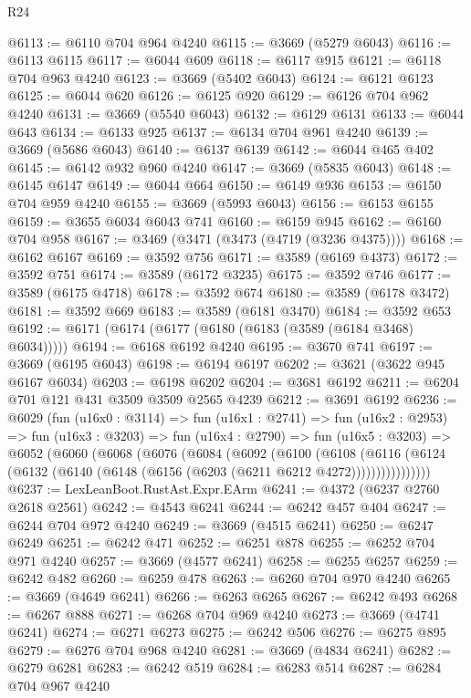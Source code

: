\begin{lexlean}{R24}
\begin{coremodule}
@6113 := @6110 @704 @964 @4240
@6115 := @3669 (@5279 @6043)
@6116 := @6113 @6115
@6117 := @6044 @609
@6118 := @6117 @915
@6121 := @6118 @704 @963 @4240
@6123 := @3669 (@5402 @6043)
@6124 := @6121 @6123
@6125 := @6044 @620
@6126 := @6125 @920
@6129 := @6126 @704 @962 @4240
@6131 := @3669 (@5540 @6043)
@6132 := @6129 @6131
@6133 := @6044 @643
@6134 := @6133 @925
@6137 := @6134 @704 @961 @4240
@6139 := @3669 (@5686 @6043)
@6140 := @6137 @6139
@6142 := @6044 @465 @402
@6145 := @6142 @932 @960 @4240
@6147 := @3669 (@5835 @6043)
@6148 := @6145 @6147
@6149 := @6044 @664
@6150 := @6149 @936
@6153 := @6150 @704 @959 @4240
@6155 := @3669 (@5993 @6043)
@6156 := @6153 @6155
@6159 := @3655 @6034 @6043 @741
@6160 := @6159 @945
@6162 := @6160 @704 @958
@6167 := @3469 (@3471 (@3473 (@4719 (@3236 @4375))))
@6168 := @6162 @6167
@6169 := @3592 @756
@6171 := @3589 (@6169 @4373)
@6172 := @3592 @751
@6174 := @3589 (@6172 @3235)
@6175 := @3592 @746
@6177 := @3589 (@6175 @4718)
@6178 := @3592 @674
@6180 := @3589 (@6178 @3472)
@6181 := @3592 @669
@6183 := @3589 (@6181 @3470)
@6184 := @3592 @653
@6192 := @6171 (@6174 (@6177 (@6180 (@6183 (@3589 (@6184 @3468) @6034)))))
@6194 := @6168 @6192 @4240
@6195 := @3670 @741
@6197 := @3669 (@6195 @6043)
@6198 := @6194 @6197
@6202 := @3621 (@3622 @945 @6167 @6034)
@6203 := @6198 @6202
@6204 := @3681 @6192
@6211 := @6204 @701 @121 @431 @3509 @3509 @2565 @4239
@6212 := @3691 @6192
@6236 := @6029
    (fun (u16x0 : @3114) =>
    fun (u16x1 : @2741) =>
    fun (u16x2 : @2953) =>
    fun (u16x3 : @3203) =>
    fun (u16x4 : @2790) =>
    fun (u16x5 : @3203) =>
    @6052
      (@6060
        (@6068
          (@6076
            (@6084
              (@6092
                (@6100
                  (@6108
                    (@6116
                      (@6124 (@6132 (@6140 (@6148 (@6156 (@6203 (@6211 @6212 @4272))))))))))))))))
@6237 := LexLeanBoot.RustAst.Expr.EArm
@6241 := @4372 (@6237 @2760 @2618 @2561)
@6242 := @4543 @6241
@6244 := @6242 @457 @404
@6247 := @6244 @704 @972 @4240
@6249 := @3669 (@4515 @6241)
@6250 := @6247 @6249
@6251 := @6242 @471
@6252 := @6251 @878
@6255 := @6252 @704 @971 @4240
@6257 := @3669 (@4577 @6241)
@6258 := @6255 @6257
@6259 := @6242 @482
@6260 := @6259 @478
@6263 := @6260 @704 @970 @4240
@6265 := @3669 (@4649 @6241)
@6266 := @6263 @6265
@6267 := @6242 @493
@6268 := @6267 @888
@6271 := @6268 @704 @969 @4240
@6273 := @3669 (@4741 @6241)
@6274 := @6271 @6273
@6275 := @6242 @506
@6276 := @6275 @895
@6279 := @6276 @704 @968 @4240
@6281 := @3669 (@4834 @6241)
@6282 := @6279 @6281
@6283 := @6242 @519
@6284 := @6283 @514
@6287 := @6284 @704 @967 @4240

\end{coremodule}
\end{lexlean}
